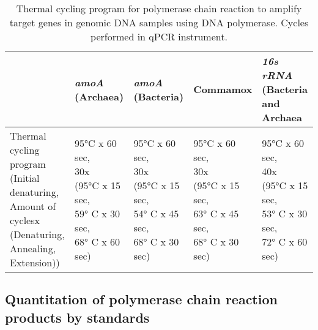 \documentclass[twoside,12pt,final]{ucthesis-CA2012}
\begin{document}
\begin{ucmainmatter}
\begin{table}
\caption{\label{tab:cycles}Thermal cycling program for polymerase chain reaction to amplify target genes in genomic DNA samples using DNA polymerase. Cycles performed in qPCR instrument.}
\centering
\begin{tabular}[t]{lllll}
\toprule
 & \makecell[c]{\textit{amoA}\\(Archaea)} & \makecell[r]{\textit{amoA}\\(Bacteria)} & Commamox & \makecell[c]{\textit{16s rRNA}\\(Bacteria and Archaea}\\
\midrule
\makecell[l]{Thermal cycling \\program\\(Initial denaturing,\\Amount of cyclesx\\(Denaturing,\\Annealing,\\Extension))} & \makecell[l]{95°C x 60 sec,\\30x\\(95°C x 15 sec,\\59° C x 30 sec,\\68° C x 60 sec)} & \makecell[l]{95°C x 60 sec,\\30x\\(95°C x 15 sec,\\54° C x 45 sec,\\68° C x 30 sec)} & \makecell[l]{95°C x 60 sec,\\30x\\(95°C x 15 sec,\\63° C x 45 sec,\\68° C x 30 sec)} & \makecell[l]{95°C x 60 sec,\\40x\\(95°C x 15 sec,\\53° C x 30 sec,\\72° C x 60 sec)}\\
\bottomrule
\end{tabular}
\end{table}
\hypertarget{quantitation-of-polymerase-chain-reaction-products-by-standards}{%
\subsection{Quantitation of polymerase chain reaction products by standards}\label{quantitation-of-polymerase-chain-reaction-products-by-standards}}


\end{ucmainmatter}
\end{document}
